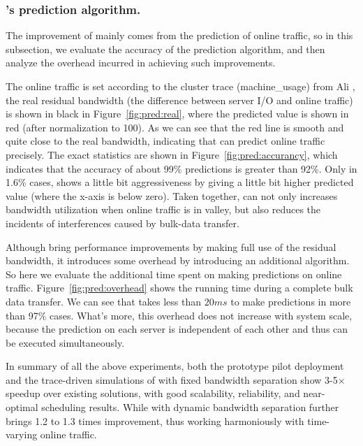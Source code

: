 {\subsubsection{\name's prediction algorithm.}
\label{subsubsec:bdsplus:predict}

The improvement of \name mainly comes from the prediction of online traffic, so in this subsection, we evaluate the accuracy of the prediction algorithm, and then analyze the overhead incurred in achieving such improvements.

 The online traffic is set according to the cluster trace (machine\_usage) from Ali \cite{datatrace}, the real residual bandwidth (the difference between server I/O and online traffic) is shown in black in Figure~\ref{fig:pred:real}, where the predicted value is shown in red (after normalization to 100). As we can see that the red line is smooth and quite close to the real bandwidth, indicating that \name can predict online traffic precisely. The exact statistics are shown in Figure~\ref{fig:pred:accurancy}, which indicates that the accuracy of about 99\% predictions is greater than 92\%. Only in 1.6\% cases, \name shows a little bit aggressiveness by giving a little bit higher predicted value (where the x-axis is below zero). Taken together, \name can not only increases bandwidth utilization when online traffic is in valley, but also reduces the incidents of interferences caused by bulk-data transfer.

Although \name bring performance improvements by making full use of the residual bandwidth, it introduces some overhead by introducing an additional algorithm. So here we evaluate the additional time spent on making predictions on online traffic. Figure~\ref{fig:pred:overhead} shows the running time during a complete bulk data transfer. We can see that \name takes less than $20ms$ to make predictions in more than 97\% cases. What's more, this overhead does not increase with system scale, because the prediction on each server is independent of each other and thus can be executed simultaneously.

In summary of all the above experiments, both the prototype pilot deployment and the trace-driven simulations of \name with fixed bandwidth separation show 3-5$\times$ speedup over existing solutions, with good scalability, reliability, and near-optimal scheduling results. While \name with dynamic bandwidth separation further brings 1.2 to 1.3 times improvement, thus working harmoniously with time-varying online traffic.
}

